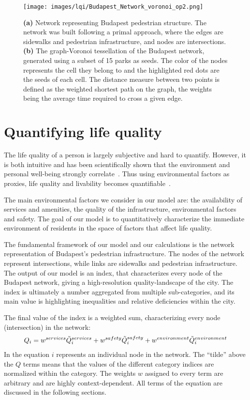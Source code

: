\begin{figure}[ht!]
	\centering
	\texttt{[image: images/lqi/Budapest\_Network\_voronoi\_op2.png]}
	\caption[Budapest pedestrian network]{\textbf{(a)} Network representing Budapest pedestrian structure. The network was built following a primal approach, where the edges are sidewalks and pedestrian infrastructure, and nodes are intersections. \textbf{(b)} The graph-Voronoi tessellation of the Budapest network, generated using a subset of 15 parks as seeds. The color of the nodes represents the cell they belong to and the highlighted red dots are the seeds of each cell. The distance measure between two points is defined as the weighted shortest path on the graph, the weights being the average time required to cross a given edge.}
	\label{fig:BPnetwork}
\end{figure}

\section{Quantifying life quality}
The life quality of a person is largely subjective and hard to quantify. However, it is both intuitive and has been scientifically shown that the environment and personal well-being strongly correlate~\cite{Rosow1961Social}. Thus using environmental factors as proxies, life quality and livability becomes quantifiable~\cite{Kahneman2006Developments}.

The main environmental factors we consider in our model are: the availability of services and amenities, the quality of the infrastructure, environmental factors and safety. The goal of our model is to quantitatively characterize the immediate environment of residents in the space of factors that affect life quality.

The fundamental framework of our model and our calculations is the network representation of Budapest’s pedestrian infrastructure. The nodes of the network represent intersections, while links are sidewalks and pedestrian infrastructure. The output of our model is an index, that characterizes every node of the Budapest network, giving a high-resolution quality-landscape of the city. The index is ultimately a number aggregated from multiple sub-categories, and its main value is highlighting inequalities and relative deficiencies within the city.

The final value of the index is a weighted sum, characterizing every node (intersection) in the network:
\begin{equation} \label{final_Q}
	Q_i =w^{services}\Tilde{Q}_i^{services} + w^{safety} \Tilde{Q}_i^{safety} + w^{environment}\Tilde{Q}_i^{environment}
\end{equation}
In the equation $i$ represents an individual node in the network. The ``tilde'' above the $Q$ terms means that the values of the different category indices are normalized within the category. The weights $w$ assigned to every term are arbitrary and are highly context-dependent. All terms of the equation are discussed in the following sections.

